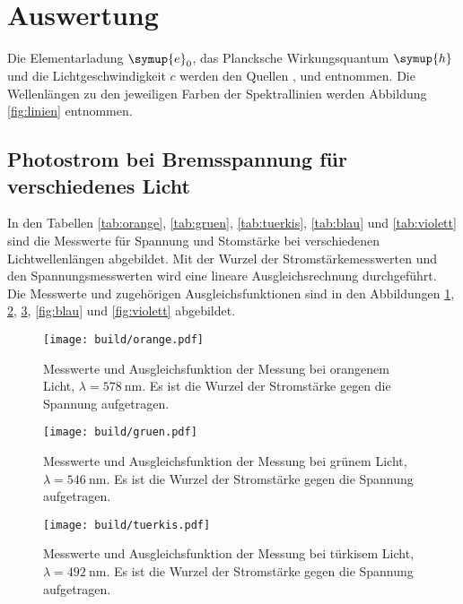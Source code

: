 \section{Auswertung}
\label{sec:Auswertung}

Die Elementarladung $\symup{e}_0$, das Plancksche Wirkungsquantum $\symup{h}$
und die Lichtgeschwindigkeit $c$ werden den Quellen
\cite{elem}, \cite{planck} und \cite{licht} entnommen. Die Wellenlängen zu den
jeweiligen Farben der Spektrallinien werden Abbildung
\ref{fig:linien}  entnommen.

\subsection{Photostrom bei Bremsspannung für verschiedenes Licht}

In den Tabellen \ref{tab:orange}, \ref{tab:gruen}, \ref{tab:tuerkis},
\ref{tab:blau} und \ref{tab:violett} sind die Messwerte für Spannung und
Stomstärke bei verschiedenen Lichtwellenlängen abgebildet. Mit der Wurzel der
Stromstärkemesswerten und den Spannungsmesswerten wird eine lineare
Ausgleichsrechnung durchgeführt. Die Messwerte und zugehörigen
Ausgleichsfunktionen sind in den Abbildungen \ref{fig:orange}, \ref{fig:gruen},
\ref{fig:tuerkis}, \ref{fig:blau} und \ref{fig:violett} abgebildet.

\begin{figure}
  \centering
  \texttt{[image: build/orange.pdf]}
  \caption{Messwerte und Ausgleichsfunktion der Messung bei orangenem Licht,
  $\lambda=\SI{578}{\nano\meter}$. Es ist die Wurzel der Stromstärke gegen
  die Spannung aufgetragen.}
  \label{fig:orange}
\end{figure}

\FloatBarrier

\begin{figure}
  \centering
  \texttt{[image: build/gruen.pdf]}
  \caption{Messwerte und Ausgleichsfunktion der Messung bei grünem Licht,
  $\lambda=\SI{546}{\nano\meter}$. Es ist die Wurzel der Stromstärke gegen
  die Spannung aufgetragen.}
  \label{fig:gruen}
\end{figure}

\FloatBarrier

\begin{figure}
  \centering
  \texttt{[image: build/tuerkis.pdf]}
  \caption{Messwerte und Ausgleichsfunktion der Messung bei türkisem Licht,
  $\lambda=\SI{492}{\nano\meter}$. Es ist die Wurzel der Stromstärke gegen
  die Spannung aufgetragen.}
  \label{fig:tuerkis}
\end{figure}


